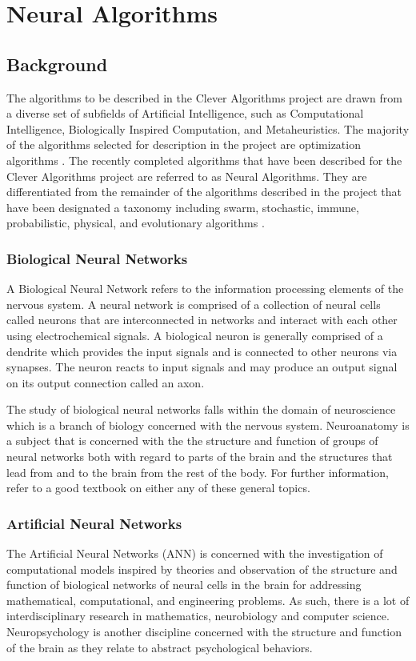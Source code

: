 \documentclass[a4paper, 11pt]{article}
\begin{document}
\section{Neural Algorithms}
\label{sec:algorithms}

% 
% 
\subsection{Background}
The algorithms to be described in the Clever Algorithms project are drawn from a diverse set of subfields of Artificial Intelligence, such as Computational Intelligence, Biologically Inspired Computation, and Metaheuristics. The majority of the algorithms selected for description in the project are optimization algorithms \cite{Brownlee2010b}. 
The recently completed algorithms that have been described for the Clever Algorithms project are referred to as Neural Algorithms. They are differentiated from the remainder of the algorithms described in the project that have been designated a taxonomy including swarm, stochastic, immune, probabilistic, physical, and evolutionary algorithms \cite{Brownlee2010b}. 

\subsubsection{Biological Neural Networks}
A Biological Neural Network refers to the information processing elements of the nervous system. A neural network is comprised of a collection of neural cells called neurons that are interconnected in networks and interact with each other using electrochemical signals. A biological neuron is generally comprised of a dendrite which provides the input signals and is connected to other neurons via synapses. The neuron reacts to input signals and may produce an output signal on its output connection called an axon.

The study of biological neural networks falls within the domain of neuroscience which is a branch of biology concerned with the nervous system. Neuroanatomy is a subject that is concerned with the the structure and function of groups of neural networks both with regard to parts of the brain and the structures that lead from and to the brain from the rest of the body. For further information, refer to a good textbook on either any of these general topics.

\subsubsection{Artificial Neural Networks}
The Artificial Neural Networks (ANN) is concerned with the investigation of computational models inspired by theories and observation of the structure and function of biological networks of neural cells in the brain for addressing mathematical, computational, and engineering problems. As such, there is a lot of interdisciplinary research in mathematics, neurobiology and computer science. Neuropsychology is another discipline concerned with the structure and function of the brain as they relate to abstract psychological behaviors.
\end{document}
